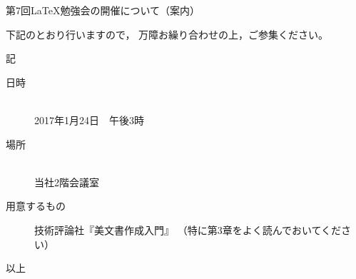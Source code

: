 \documentclass[12pt]{jsarticle}
\begin{document}
\begin{center}
	\large 第7回\LaTeX 勉強会の開催について（案内）
\end{center}
下記のとおり行いますので，
万障お繰り合わせの上，ご参集ください。
\begin{center} 記 \end{center}
\begin{description}
	\item[日時] \mbox{} \\
	  2017年1月24日　午後3時
	\item[場所] \mbox{} \\
	  当社2階会議室
	\item[用意するもの] 技術評論社『\LaTeXe 美文書作成入門』
	（特に第3章をよく読んでおいてください）
\end{description}
\begin{flushright} 以上 \end{flushright}
\end{document}
